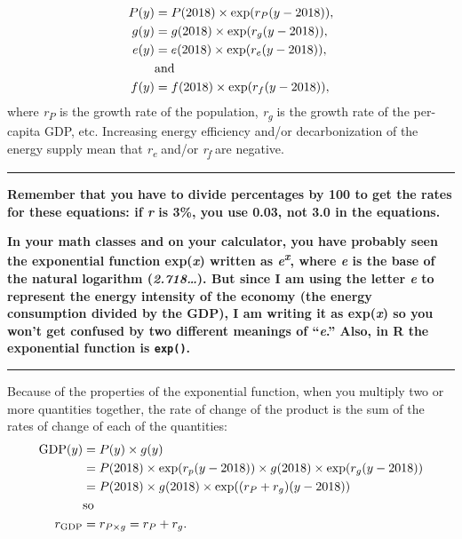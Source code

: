 \documentclass[
]{article}
\begin{document}
\[
\begin{aligned}
  P(y) &= P(2018) \times \exp(r_P (y - 2018)),\\
  g(y) &= g(2018) \times \exp(r_g (y - 2018)),\\
  e(y) &= e(2018) \times \exp(r_e (y - 2018)),\\
  \lefteqn{\text{and}}\\
  f(y) &= f(2018) \times \exp(r_f (y - 2018)),\\
\end{aligned}
\] where \emph{r\textsubscript{P}} is the growth rate of the population,
\emph{r\textsubscript{g}} is the growth rate of the per-capita GDP, etc.
Increasing energy efficiency and/or decarbonization of the energy supply
mean that \emph{r\textsubscript{e}} and/or \emph{r\textsubscript{f}} are
negative.

\begin{center}\rule{0.5\linewidth}{0.5pt}\end{center}

\textbf{Remember that you have to divide percentages by 100 to get the
rates for these equations: if \emph{r} is 3\%, you use 0.03, not 3.0 in
the equations.}

\textbf{In your math classes and on your calculator, you have probably
seen the exponential function exp(\emph{x}) written as
\emph{e\textsuperscript{x}}, where \emph{e} is the base of the natural
logarithm (\emph{2.718\ldots{}}). But since I am using the letter
\emph{e} to represent the energy intensity of the economy (the energy
consumption divided by the GDP), I am writing it as exp(\emph{x}) so you
won't get confused by two different meanings of ``\emph{e}.'' Also, in R
the exponential function is \texttt{exp()}.}

\begin{center}\rule{0.5\linewidth}{0.5pt}\end{center}

Because of the properties of the exponential function, when you multiply
two or more quantities together, the rate of change of the product is
the sum of the rates of change of each of the quantities: \[
\begin{aligned}
  \mathrm{GDP}(y) &= P(y)\times g(y)\\
    &= P(2018) \times \exp(r_p (y - 2018)) 
    \times g(2018) \times \exp(r_g (y - 2018))\\
    &= P(2018)\times g(2018)
    \times \exp((r_P + r_g) (y - 2018))\\
    \lefteqn{\text{so}}\\
  r_{\mathrm{GDP}} &= r_{P\times g} = r_P + r_g.
\end{aligned}
\]
\end{document}

